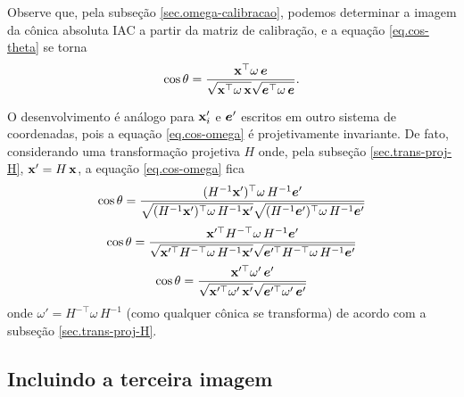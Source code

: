Observe que, pela subseção \ref{sec.omega-calibracao}, podemos determinar a imagem da cônica absoluta IAC a partir da matriz de calibração, e a equação \ref{eq.cos-theta} se torna
\begin{equation}\label{eq.cos-omega}
\cos\theta=\frac{\mathbf{x}^\top\omega\,\boldsymbol{e}}{\sqrt{\mathbf{x}^\top\omega\,\mathbf{x}}\sqrt{\boldsymbol{e}^\top\omega\,\boldsymbol{e}}}.
\end{equation} 

O desenvolvimento é análogo para $\mathbf{x}'_i$ e $\boldsymbol{e}'$ escritos em outro sistema de coordenadas, pois a equação \ref{eq.cos-omega} é projetivamente invariante. De fato, considerando uma transformação projetiva $H$ onde, pela subseção \ref{sec.trans-proj-H},  $\mathbf{x}'=H\,\mathbf{x}$, a equação \ref{eq.cos-omega} fica
\begin{equation*}
\cos\theta=\frac{(H^{-1}\mathbf{x}')^\top\omega\,H^{-1}\boldsymbol{e}'}{\sqrt{(H^{-1}\mathbf{x}')^\top\omega\,H^{-1}\mathbf{x}'}\sqrt{(H^{-1}\boldsymbol{e}')^\top\omega\,H^{-1}\boldsymbol{e}'}}
\end{equation*} 
\begin{equation*}
\cos\theta=\frac{\mathbf{x}'^\top H^{-\top}\omega\,H^{-1}\boldsymbol{e}'}{\sqrt{\mathbf{x}'^\top H^{-\top}\omega\,H^{-1}\mathbf{x}'}\sqrt{\boldsymbol{e}'^\top H^{-\top}\omega\,H^{-1}\boldsymbol{e}'}}
\end{equation*}
\begin{equation*}
\cos\theta=\frac{\mathbf{x}'^\top \omega'\,\boldsymbol{e}'}{\sqrt{\mathbf{x}'^\top \omega'\,\mathbf{x}'}\sqrt{\boldsymbol{e}'^\top \omega'\,\boldsymbol{e}'}}
\end{equation*}
onde $\omega'=H^{-\top}\omega\,H^{-1}$ (como qualquer cônica se transforma) de acordo com a subseção \ref{sec.trans-proj-H}.

\subsection{Incluindo a terceira imagem}

